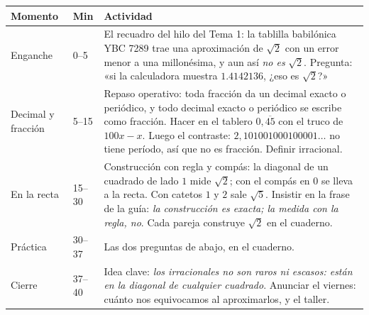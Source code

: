 \documentclass[11pt]{article}
\begin{document}
\begin{center}
{\renewcommand{\arraystretch}{1.3}
\begin{tabularx}{\linewidth}{@{}l l X@{}}
  \toprule
  \textbf{Momento} & \textbf{Min} & \textbf{Actividad}\\
  \midrule
  Enganche & 0--5 & El recuadro del hilo del Tema 1: la tablilla babilónica YBC 7289 trae
    una aproximación de $\sqrt{2}$ con un error menor a una millonésima, y aun así
    \emph{no es} $\sqrt{2}$. Pregunta: «si la calculadora muestra $\num{1,4142136}$,
    ¿eso es $\sqrt{2}$?»\\
  Decimal y fracción & 5--15 & Repaso operativo: toda fracción da un decimal exacto o
    periódico, y todo decimal exacto o periódico se escribe como fracción. Hacer en el
    tablero $0{,}\overline{45}$ con el truco de $100x - x$. Luego el contraste:
    $2{,}101001000100001\ldots$ no tiene período, así que no es fracción. Definir
    irracional.\\
  En la recta & 15--30 & Construcción con regla y compás: la diagonal de un cuadrado de
    lado $1$ mide $\sqrt{2}$; con el compás en $0$ se lleva a la recta. Con catetos $1$ y
    $2$ sale $\sqrt{5}$. Insistir en la frase de la guía: \emph{la construcción es exacta;
    la medida con la regla, no}. Cada pareja construye $\sqrt{2}$ en el cuaderno.\\
  Práctica & 30--37 & Las dos preguntas de abajo, en el cuaderno.\\
  Cierre & 37--40 & Idea clave: \emph{los irracionales no son raros ni escasos: están en
    la diagonal de cualquier cuadrado}. Anunciar el viernes: cuánto nos equivocamos al
    aproximarlos, y el taller.\\
  \bottomrule
\end{tabularx}}
\end{center}
\end{document}
